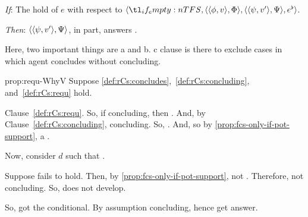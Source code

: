 \begin{note}
  \begin{proposition}
    \label{prop:requ-WhyV}

    \begin{itenum}
    \item[\emph{If}:]
      The  hold of \(e\) with respect to \(\langle \vAgent{}, \pvp{\phi}{v}{\Phi}, \pvp{\psi}{v'}{\Psi}, e^{\flat} \rangle\).
    \item[\emph{Then}:]
        \(\langle \langle \psi, v' \rangle, \Psi \rangle\), in part, answers \qWhyV{}.
    \end{itenum}
    \vspace{-\baselineskip}
  \end{proposition}

  Here, two important things are a and b.
  c clause is there to exclude cases in which agent concludes without concluding.

  \begin{argument}{prop:requ-WhyV}
    Suppose \ref{def:rCs:concludes},~\ref{def:rCs:concluding}, and~\ref{def:rCs:requ} hold.


    Clause~\ref{def:rCs:requ}.
    So, if concluding, then \fc{}.
    And, by Clause~\ref{def:rCs:concluding}, concluding.
    So, \fc{}.
    And, so by \autoref{prop:fcs-only-if-pot-support}, a \ros{}.

    Now, consider \(d\) such that \requ{}.

    Suppose \ros{} fails to hold.
    Then, by \autoref{prop:fcs-only-if-pot-support}, not \fc{}.
    Therefore, not concluding.
    So, does not develop.

    So, got the conditional.
    By assumption concluding, hence get answer.
  \end{argument}
\end{note}

